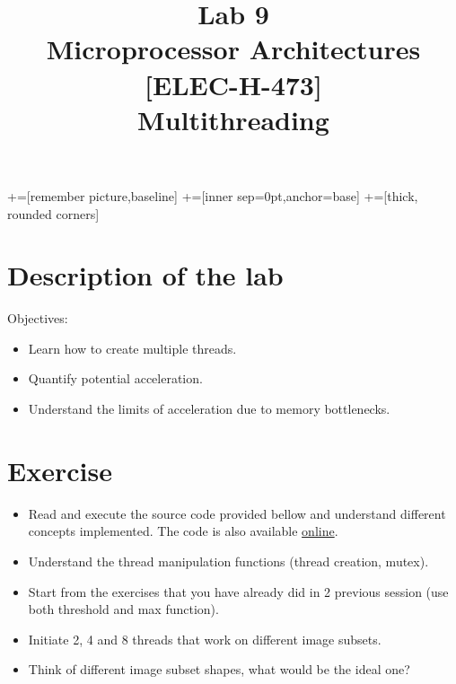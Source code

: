 \documentclass[10pt,a4paper]{article}
\date{\vspace{-1cm}\version}
\title{\vspace{-2cm} Lab 9\\ Microprocessor Architectures [ELEC-H-473]\\ Multithreading \ifthenelse{\boolean{corrige}}{~\\Corrigé}{}}
\theoremstyle{definition}%
\begin{document}
\newcommand\tabnode[1]{\addtocounter{nodecount}{1} \tikz \node (\arabic{nodecount}) {#1};}

+=[remember picture,baseline]
+=[inner sep=0pt,anchor=base]
+=[thick, rounded corners]



\maketitle
\section*{Description of the lab}
Objectives:
\begin{itemize}
 \item Learn how to create multiple threads.
 \item Quantify potential acceleration.
 \item Understand the limits of acceleration due to memory bottlenecks.
\end{itemize}

\section*{Exercise}
\begin{itemize}
    \item Read and execute the source code provided bellow and understand different concepts implemented.
    The code is also available \href{https://gist.github.com/parastuffs/a7818b1ff46de40b95949943fbd53c8b}{online}.
    \item Understand the thread manipulation functions (thread creation, mutex).
    \item Start from the exercises that you have already did in 2 previous session (use both threshold and max function).
    \item Initiate 2, 4 and 8 threads that work on different image subsets.
    \item Think of different image subset shapes, what would be the ideal one?
\end{itemize}
\end{document}
